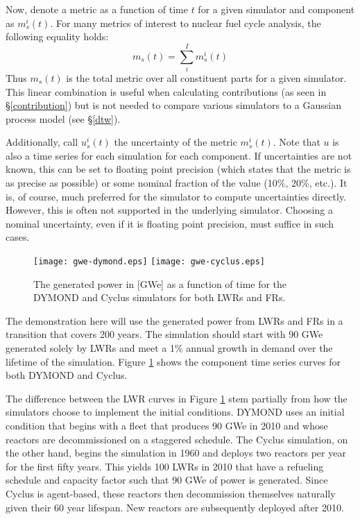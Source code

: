 \documentclass{ntmanuscript}
\begin{document}
Now, denote a metric as a function of time $t$ for a given simulator and
component as $m_s^i(t)$. For many metrics of interest
to nuclear fuel cycle analysis, the following equality holds:
\begin{equation}
m_s(t) = \sum_i^I m_s^i(t)
\end{equation}
Thus $m_s(t)$ is the total metric over all constituent parts for a given
simulator. This linear combination is useful when calculating contributions
(as seen in \S\ref{contribution}) but is not needed to compare various
simulators to a Gaussian process model (see \S\ref{dtw}).

Additionally, call $u_s^i(t)$ the uncertainty of the metric
$m_s^i(t)$. Note that $u$ is also a time series for each simulation for
each component. If uncertainties are not known, this can be set to floating
point precision (which states that the metric is as precise as possible) or
some nominal fraction of the value (10\%, 20\%, etc.). It is, of course,
much preferred for the simulator to compute
uncertainties directly. However, this is often not supported in the underlying
simulator. Choosing a nominal uncertainty, even if it is floating point
precision, must suffice in such cases.

\begin{figure}[htb]
\centering
\texttt{[image: gwe-dymond.eps]}
\texttt{[image: gwe-cyclus.eps]}
\caption{The generated power in [GWe] as a function of time for the DYMOND and
Cyclus simulators for both LWRs and FRs.}
\label{gwe-simulators}
\end{figure}

The demonstration here will use the generated power from LWRs and FRs in
a transition that covers 200 years. The simulation should start with
90 GWe generated solely by LWRs and meet a 1\% annual growth in demand over the
lifetime of the simulation. Figure \ref{gwe-simulators} shows the component time
series curves for both DYMOND and Cyclus.

The difference between the LWR curves in Figure \ref{gwe-simulators} stem
partially from how the simulators choose to implement the initial conditions.
DYMOND uses an initial condition that
begins with a fleet that produces 90 GWe in 2010 and whose reactors are
decommissioned on a staggered schedule. The Cyclus simulation, on the other
hand, begins the simulation in 1960 and deploys two reactors per year for
the first fifty years. This yields 100 LWRs in 2010 that have a refueling
schedule and capacity factor such that 90 GWe of power is generated. Since
Cyclus is agent-based, these reactors then decommission themselves naturally
given their 60 year lifespan. New reactors are subsequently deployed after
2010.
\end{document}
